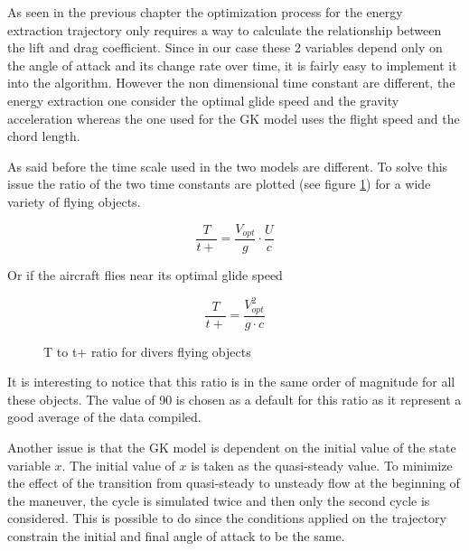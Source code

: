 
\par As seen in the previous chapter the optimization process for the energy extraction trajectory only requires a way to calculate the relationship between the lift and drag coefficient.
Since in our case these 2 variables depend only on the angle of attack and its change rate over time, it is fairly easy to implement it into the algorithm.
However the non dimensional time constant are different, the energy extraction one consider the optimal glide speed and the gravity acceleration whereas the one used for the GK model uses the flight speed and the chord length.


As said before the time scale used in the two models are different.
To solve this issue the ratio of the two time constants are plotted (see figure \ref{fig:T_t+_ratio}) for a wide variety of flying objects.

\begin{equation}
  \frac{T}{t+}=\frac{V_{opt}}{g} \cdot \frac{U}{c}
  \label{eqn:T_t+}
\end{equation}

Or if the aircraft flies near its optimal glide speed

\begin{equation}
  \frac{T}{t+}=\frac{V_{opt}^2}{g \cdot c}
  \label{eqn:T_t+_ratio}
\end{equation}

\begin{figure}[ht]
  \begin{center}
  \end{center}
  \caption{T to t+ ratio for divers flying objects}
  \label{fig:T_t+_ratio}
\end{figure}

\par It is interesting to notice that this ratio is in the same order of magnitude for all these objects.
The value of 90 is chosen as a default for this ratio as it represent a good average of the data compiled.


\par Another issue is that the GK model is dependent on the initial value of the state variable $x$.
The initial value of $x$ is taken as the quasi-steady value.
To minimize the effect of the transition from quasi-steady to unsteady flow at the beginning of the maneuver, the cycle is simulated twice and then only the second cycle is considered.
This is possible to do since the conditions applied on the trajectory constrain the initial and final angle of attack to be the same.


